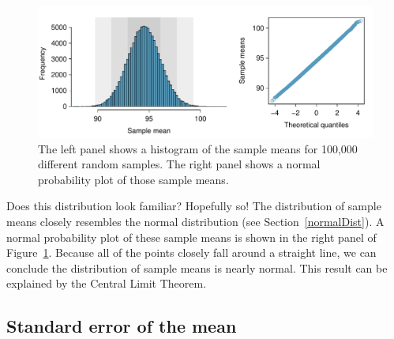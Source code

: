 \begin{figure}[H]
   \centering
   \includegraphics[width=\textwidth]{04-5/figures/netTimeBigSamplingDistribution/netTimeBigSamplingDistribution}
   \caption{The left panel shows a histogram of the sample means for 100,000 different random samples. The right panel shows a normal probability plot of those sample means.}
   \label{netTimeBigSamplingDistribution}
\end{figure}



Does this distribution look familiar? Hopefully so! The distribution of sample means closely resembles the normal distribution (see Section~\ref{normalDist}). A normal probability plot of these sample means is shown in the right panel of Figure~\ref{netTimeBigSamplingDistribution}. Because all of the points closely fall around a straight line, we can conclude the distribution of sample means is nearly normal. This result can be explained by the Central Limit Theorem.











\subsection{Standard error of the mean}
\label{seOfTheMean}

